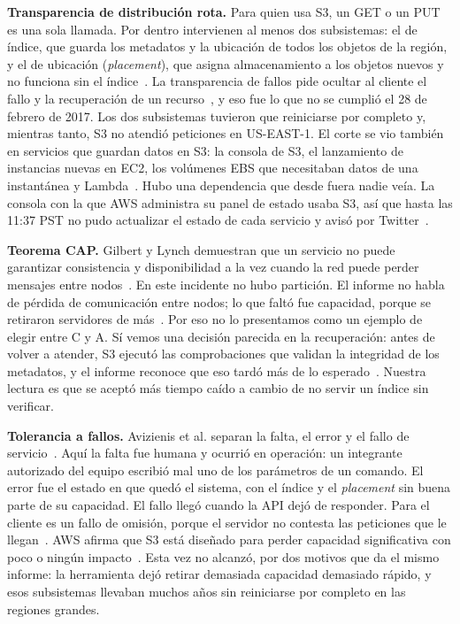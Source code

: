 \textbf{Transparencia de distribución rota.} Para quien usa S3, un GET o un PUT es una sola llamada. Por dentro intervienen al menos dos subsistemas: el de índice, que guarda los metadatos y la ubicación de todos los objetos de la región, y el de ubicación (\textit{placement}), que asigna almacenamiento a los objetos nuevos y no funciona sin el índice~\cite{aws-s3-2017}. La transparencia de fallos pide ocultar al cliente el fallo y la recuperación de un recurso~\cite{vansteen2023}, y eso fue lo que no se cumplió el 28 de febrero de 2017. Los dos subsistemas tuvieron que reiniciarse por completo y, mientras tanto, S3 no atendió peticiones en US-EAST-1. El corte se vio también en servicios que guardan datos en S3: la consola de S3, el lanzamiento de instancias nuevas en EC2, los volúmenes EBS que necesitaban datos de una instantánea y Lambda~\cite{aws-s3-2017}. Hubo una dependencia que desde fuera nadie veía. La consola con la que AWS administra su panel de estado usaba S3, así que hasta las 11:37 PST no pudo actualizar el estado de cada servicio y avisó por Twitter~\cite{aws-s3-2017}.

\textbf{Teorema CAP.} Gilbert y Lynch demuestran que un servicio no puede garantizar consistencia y disponibilidad a la vez cuando la red puede perder mensajes entre nodos~\cite{gilbert2002}. En este incidente no hubo partición. El informe no habla de pérdida de comunicación entre nodos; lo que faltó fue capacidad, porque se retiraron servidores de más~\cite{aws-s3-2017}. Por eso no lo presentamos como un ejemplo de elegir entre C y A. Sí vemos una decisión parecida en la recuperación: antes de volver a atender, S3 ejecutó las comprobaciones que validan la integridad de los metadatos, y el informe reconoce que eso tardó más de lo esperado~\cite{aws-s3-2017}. Nuestra lectura es que se aceptó más tiempo caído a cambio de no servir un índice sin verificar.

\textbf{Tolerancia a fallos.} Avizienis et al. separan la falta, el error y el fallo de servicio~\cite{avizienis2004}. Aquí la falta fue humana y ocurrió en operación: un integrante autorizado del equipo escribió mal uno de los parámetros de un comando. El error fue el estado en que quedó el sistema, con el índice y el \textit{placement} sin buena parte de su capacidad. El fallo llegó cuando la API dejó de responder. Para el cliente es un fallo de omisión, porque el servidor no contesta las peticiones que le llegan~\cite{vansteen2023}. AWS afirma que S3 está diseñado para perder capacidad significativa con poco o ningún impacto~\cite{aws-s3-2017}. Esta vez no alcanzó, por dos motivos que da el mismo informe: la herramienta dejó retirar demasiada capacidad demasiado rápido, y esos subsistemas llevaban muchos años sin reiniciarse por completo en las regiones grandes.
